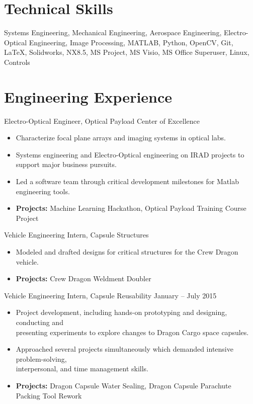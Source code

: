 \documentclass[10pt,final,sans]{resume}
\begin{document}
\section{Technical Skills}
Systems Engineering, Mechanical Engineering, Aerospace Engineering, Electro-Optical Engineering, Image Processing, MATLAB, Python, OpenCV, Git, {\textrm \LaTeX}, Solidworks, NX8.5, MS Project, MS Visio, MS Office Superuser, Linux, Controls

\section{Engineering Experience}
Electro-Optical Engineer, Optical Payload Center of Excellence
\begin{itemize}
  \item Characterize focal plane arrays and imaging systems in optical labs.
  \item Systems engineering and Electro-Optical engineering on IRAD projects to support major business pursuits.
  \item Led a software team through critical development milestones for Matlab engineering tools. 
  \item {\bf Projects:} Machine Learning Hackathon, Optical Payload Training Course Project
\end{itemize} 
Vehicle Engineering Intern, Capsule Structures
\begin{itemize}
  \item Modeled and drafted designs for critical structures for the Crew Dragon vehicle.
  \item {\bf Projects:} Crew Dragon Weldment Doubler
\end{itemize}

Vehicle Engineering Intern, Capsule Reusability \hfill January -- July 2015
\begin{itemize}
  \item Project development, including hands-on prototyping and designing, conducting and \\
  presenting experiments to explore changes to Dragon Cargo space capsules.
  \item Approached several projects simultaneously which demanded intensive problem-solving, \\
  interpersonal, and time management skills.
  \item {\bf Projects:} Dragon Capsule Water Sealing, Dragon Capsule Parachute Packing Tool Rework
\end{itemize}
\end{document}
